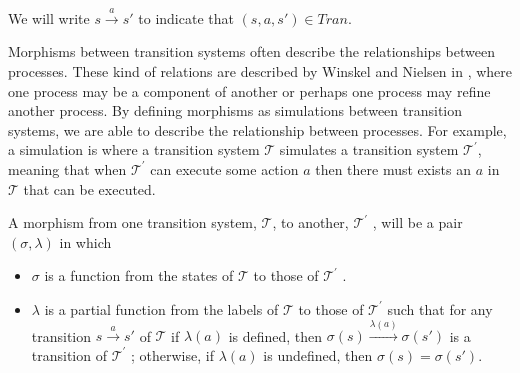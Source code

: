     We will write $s \xrightarrow{a} s'$ to indicate  that $(s,a,s') \in Tran$.
    
    Morphisms between transition systems often describe the relationships between processes. These kind of relations are described by Winskel and Nielsen in \cite{winskel95modelsCategory}, where one process may be a component of another or perhaps one process may refine another process. By defining morphisms as simulations between transition systems, we are able to describe the relationship between processes. For example, a simulation is where a transition system $\mathcal{T}$ simulates a transition system $\mathcal{T}^{'}$, meaning that when $\mathcal{T}^{'}$ can execute some action $a$ then there must exists an $a$ in $\mathcal{T}$ that can be executed.
    
    
    \begin{definition}\label{def:morphism-of-transition-system}
        A morphism from one transition system, $\mathcal{T}$, to another, $\mathcal{T}^{'}$ , will be a pair $(\sigma, \lambda)$ in which
        \begin{itemize}
            \item $\sigma$ is a function from the states of $\mathcal{T}$ to those of $\mathcal{T}^{'}$ .
            \item $\lambda$ is a partial function from the labels of $\mathcal{T}$ to those of $\mathcal{T}^{'}$ such that for any transition $s \xrightarrow{a} s'$ of $\mathcal{T}$ if $\lambda(a)$ is defined, then $\sigma(s) \xrightarrow{\lambda(a)} \sigma(s')$ is a transition of $\mathcal{T}^{'}$ ; otherwise, if $\lambda(a)$ is undefined, then $\sigma(s) = \sigma(s')$.
        \end{itemize}
    \end{definition}
    

